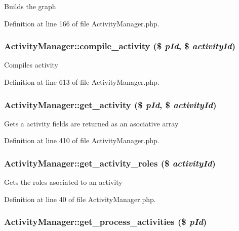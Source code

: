 Builds the graph 

Definition at line 166 of file Activity\-Manager.php.
\subsubsection{\setlength{\rightskip}{0pt plus 5cm}Activity\-Manager::compile\_\-activity (\$ {\em p\-Id}, \$ {\em activity\-Id})}\label{classActivityManager_a22}


Compiles activity 

Definition at line 613 of file Activity\-Manager.php.
\subsubsection{\setlength{\rightskip}{0pt plus 5cm}Activity\-Manager::get\_\-activity (\$ {\em p\-Id}, \$ {\em activity\-Id})}\label{classActivityManager_a16}


Gets a activity fields are returned as an asociative array 

Definition at line 410 of file Activity\-Manager.php.
\subsubsection{\setlength{\rightskip}{0pt plus 5cm}Activity\-Manager::get\_\-activity\_\-roles (\$ {\em activity\-Id})}\label{classActivityManager_a3}


Gets the roles asociated to an activity 

Definition at line 40 of file Activity\-Manager.php.
\subsubsection{\setlength{\rightskip}{0pt plus 5cm}Activity\-Manager::get\_\-process\_\-activities (\$ {\em p\-Id})}\label{classActivityManager_a11}



